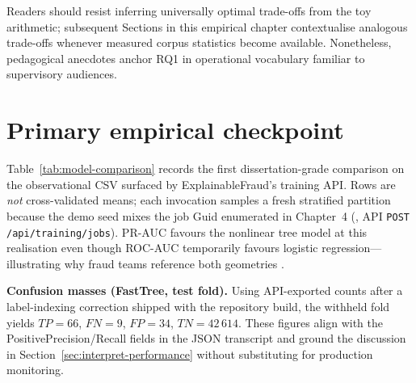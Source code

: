Readers should resist inferring universally optimal trade-offs from the toy arithmetic; subsequent Sections in this empirical chapter contextualise analogous trade-offs whenever measured corpus statistics become available. Nonetheless, pedagogical anecdotes anchor RQ1 in operational vocabulary familiar to supervisory audiences.

\section{Primary empirical checkpoint}
Table~\ref{tab:model-comparison} records the first dissertation-grade comparison on the observational CSV surfaced by ExplainableFraud's training API. Rows are \emph{not} cross-validated means; each invocation samples a fresh stratified partition because the demo seed mixes the job Guid enumerated in Chapter~4 (, API \texttt{POST /api/training/jobs}). PR-AUC favours the nonlinear tree model at this realisation even though ROC-AUC temporarily favours logistic regression---illustrating why fraud teams reference both geometries \cite{davis_goadrich_icml06}.

\begin{table}[htbp]
\centering
{\footnotesize\setlength{\tabcolsep}{3pt}\renewcommand{\arraystretch}{1.15}%
}
\caption{Hold-out metrics on the stratified $15\%$ test fold ($42\,723$ rows: $75$ fraud / $42\,648$ legitimate) after fitting on $199\,364$ training rows. FastTree scalars replicate \texttt{thesis-training-snapshot.json}; LBFGS row replicates \texttt{thesis-logistic-snapshot.json} (distinct shuffle).}
\label{tab:model-comparison}
\end{table}

\noindent\textbf{Confusion masses (FastTree, test fold).} Using API-exported counts after a label-indexing correction shipped with the repository build, the withheld fold yields $TP{=}66$, $FN{=}9$, $FP{=}34$, $TN{=}42\,614$. These figures align with the PositivePrecision/Recall fields in the JSON transcript and ground the discussion in Section~\ref{sec:interpret-performance} without substituting for production monitoring.

